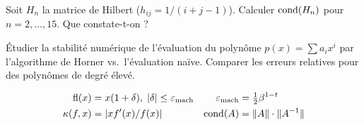 \begin{exercice}
Soit $H_n$ la matrice de Hilbert ($h_{ij}=1/(i+j-1)$). Calculer $\mathrm{cond}(H_n)$ pour $n=2,\ldots,15$. Que constate-t-on ?
\end{exercice}

\begin{exercice}
\'Etudier la stabilit\'e num\'erique de l'\'evaluation du polyn\^ome $p(x)=\sum a_ix^i$ par l'algorithme de Horner vs.\ l'\'evaluation na\"ive. Comparer les erreurs relatives pour des polyn\^omes de degr\'e \'elev\'e.
\end{exercice}

\begin{formules}
\begin{align*}
\mathrm{fl}(x) &= x(1+\delta),\;|\delta|\leq\varepsilon_{\mathrm{mach}} &
\varepsilon_{\mathrm{mach}} &= \tfrac{1}{2}\beta^{1-t} \\
\kappa(f,x) &= |xf'(x)/f(x)| &
\mathrm{cond}(A) &= \|A\|\cdot\|A^{-1}\|
\end{align*}
\end{formules}
